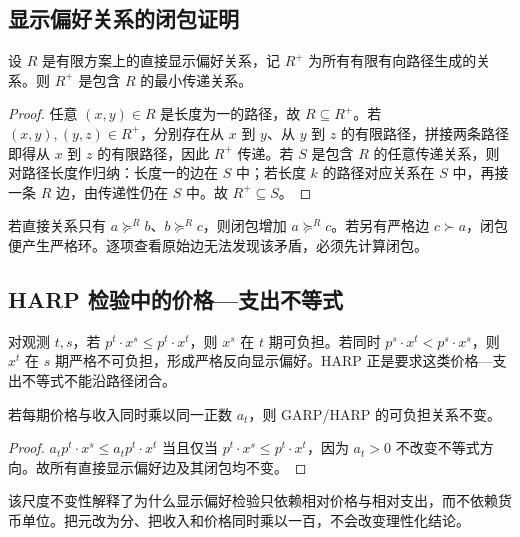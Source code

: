 \subsection{显示偏好关系的闭包证明}

\begin{proposition}[传递闭包的最小性]
设 $R$ 是有限方案上的直接显示偏好关系，记 $R^+$ 为所有有限有向路径生成的关系。则 $R^+$ 是包含 $R$ 的最小传递关系。
\end{proposition}
\begin{proof}
任意 $(x,y)\in R$ 是长度为一的路径，故 $R\subseteq R^+$。若 $(x,y),(y,z)\in R^+$，分别存在从 $x$ 到 $y$、从 $y$ 到 $z$ 的有限路径，拼接两条路径即得从 $x$ 到 $z$ 的有限路径，因此 $R^+$ 传递。若 $S$ 是包含 $R$ 的任意传递关系，则对路径长度作归纳：长度一的边在 $S$ 中；若长度 $k$ 的路径对应关系在 $S$ 中，再接一条 $R$ 边，由传递性仍在 $S$ 中。故 $R^+\subseteq S$。
\end{proof}

\begin{example}[闭包如何发现隐含矛盾]
若直接关系只有 $a\succeq^Rb$、$b\succeq^Rc$，则闭包增加 $a\succeq^Rc$。若另有严格边 $c\succ a$，闭包便产生严格环。逐项查看原始边无法发现该矛盾，必须先计算闭包。
\end{example}

\subsection{HARP 检验中的价格—支出不等式}
对观测 $t,s$，若 $p^t\cdot x^s\le p^t\cdot x^t$，则 $x^s$ 在 $t$ 期可负担。若同时 $p^s\cdot x^t<p^s\cdot x^s$，则 $x^t$ 在 $s$ 期严格不可负担，形成严格反向显示偏好。HARP 正是要求这类价格—支出不等式不能沿路径闭合。

\begin{proposition}[支出不等式的尺度不变性]
若每期价格与收入同时乘以同一正数 $a_t$，则 GARP/HARP 的可负担关系不变。
\end{proposition}
\begin{proof}
$a_tp^t\cdot x^s\le a_tp^t\cdot x^t$ 当且仅当 $p^t\cdot x^s\le p^t\cdot x^t$，因为 $a_t>0$ 不改变不等式方向。故所有直接显示偏好边及其闭包均不变。
\end{proof}

\begin{remark}
该尺度不变性解释了为什么显示偏好检验只依赖相对价格与相对支出，而不依赖货币单位。把元改为分、把收入和价格同时乘以一百，不会改变理性化结论。
\end{remark}
